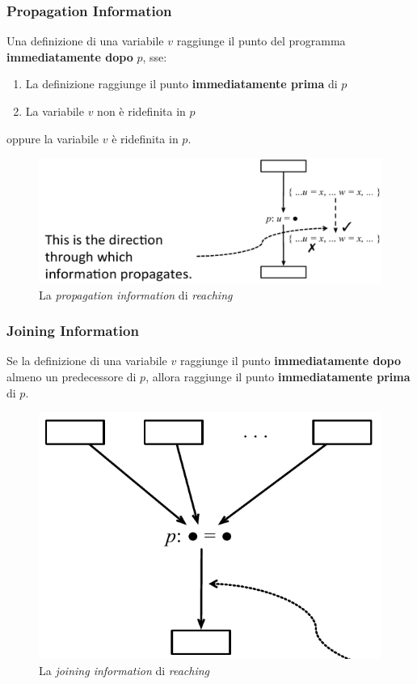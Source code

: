 \subsubsection{Propagation Information}
Una definizione di una variabile $v$ raggiunge il punto del programma
\textbf{immediatamente dopo} $p$, sse:
\begin{enumerate}
\item La definizione raggiunge il punto \textbf{immediatamente prima} di $p$
\item La variabile $v$ non \`e ridefinita in $p$
\end{enumerate}

oppure la variabile $v$ \`e ridefinita in $p$.

\begin{figure}[H]
  \centering
  \includegraphics[scale=0.4]{res/image/propagation_reaching}
  \caption{La \textit{propagation information} di \textit{reaching}}
  \label{img:propagation_reaching}
\end{figure}

\subsubsection{Joining Information}
Se la definizione di una variabile $v$ raggiunge il punto
\textbf{immediatamente dopo} almeno un predecessore di $p$, allora raggiunge il
punto \textbf{immediatamente prima} di $p$.

\begin{figure}[H]
  \centering
  \includegraphics[scale=0.4]{res/image/joining_reaching}
  \caption{La \textit{joining information} di \textit{reaching}}
  \label{img:joining_reaching}
\end{figure}

